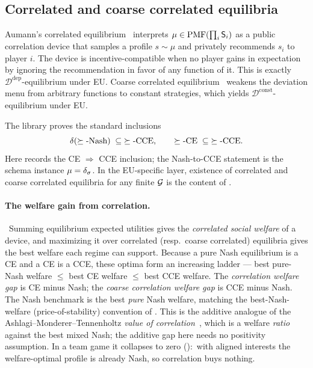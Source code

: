 \subsection{Correlated and coarse correlated equilibria}
\label{sec:solution-concepts:correlated}

Aumann's correlated equilibrium~\citep{Aumann1974} interprets
$\mu \in \mathrm{PMF}(\prod_i \mathsf{S}_i)$ as a public correlation device
that samples a profile $s \sim \mu$ and privately recommends $s_i$ to
player $i$.  The
device is incentive-compatible when no player gains in expectation
by ignoring the recommendation in favor of any function of it.
This is exactly $\mathcal{D}^{\mathrm{dep}}$-equilibrium under EU\@.
Coarse correlated equilibrium~\citep{HartMasColell2000} weakens the
deviation menu from arbitrary functions to constant strategies,
which yields $\mathcal{D}^{\mathrm{const}}$-equilibrium under EU.

The library proves the standard inclusions
\[
  \delta(\succeq\text{-Nash}) \;\subseteq\; \succeq\text{-CCE},
  \qquad
  \succeq\text{-CE} \;\subseteq\; \succeq\text{-CCE}.
\]
Here  records the CE
$\Rightarrow$ CCE inclusion; the Nash-to-CCE statement is the schema
instance $\mu = \delta_{\sigma}$.  In the EU-specific layer, existence of
correlated and coarse correlated equilibria for any finite
$\mathcal{G}$ is the content of .

\paragraph{The welfare gain from correlation.}\
Summing equilibrium expected utilities gives the \emph{correlated
social welfare} of a device, and maximizing it over correlated
(resp.\ coarse correlated) equilibria gives the best welfare each
regime can support.  Because a pure Nash equilibrium is a CE and a CE
is a CCE, these optima form an increasing ladder — best pure-Nash
welfare $\le$ best CE welfare $\le$ best CCE welfare.  The
\emph{correlation welfare gap} is CE minus Nash; the
\emph{coarse correlation welfare gap} is CCE minus Nash.  The Nash
benchmark is the best \emph{pure} Nash welfare, matching
the best-Nash-welfare (price-of-stability) convention of
.  This is the additive analogue of
the Ashlagi–Monderer–Tennenholtz \emph{value of correlation}~\citep{AshlagiMondererTennenholtz2008}, which is a
welfare \emph{ratio} against the best mixed Nash; the additive gap here
needs no positivity assumption.  In a team game it collapses to zero
(\TT{IsTeamGame.correlationWelfareGap\_eq\_zero}):\ with aligned
interests the welfare-optimal profile is already Nash, so correlation
buys nothing.

